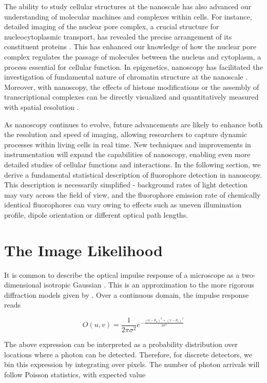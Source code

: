 The ability to study cellular structures at the nanoscale has also advanced our understanding of molecular machines and complexes within cells. For instance, detailed imaging of the nuclear pore complex, a crucial structure for nucleocytoplasmic transport, has revealed the precise arrangement of its constituent proteins \parencite{Wang2023}. This has enhanced our knowledge of how the nuclear pore complex regulates the passage of molecules between the nucleus and cytoplasm, a process essential for cellular function. In epigenetics, nanoscopy has facilitated the investigation of fundamental nature of chromatin structure at the nanoscale \parencite{Ricci2015}. Moreover, with nanoscopy, the effects of histone modifications or the assembly of transcriptional complexes can be directly visualized and quantitatively measured with spatial resolution \parencite{Ricci2015,Nozaki2017,Boettiger2016}.

As nanoscopy continues to evolve, future advancements are likely to enhance both the resolution and speed of imaging, allowing researchers to capture dynamic processes within living cells in real time. New techniques and improvements in instrumentation will expand the capabilities of nanoscopy, enabling even more detailed studies of cellular functions and interactions. In the following section, we derive a fundamental statistical description of fluorophore detection in nanoscopy. This description is necessarily simplified - background rates of light detection may vary across the field of view, and the fluorophore emission rate of chemically identical fluorophores can vary owing to effects such as uneven illumination profile, dipole orientation or different optical path lengths.


\section{The Image Likelihood}

It is common to describe the optical impulse response of a microscope as a two-dimensional isotropic Gaussian \parencite{Zhang2007}. This is an approximation to the more rigorous diffraction models given by \parencite{Richards1959,Gibson1989}. Over a continuous domain, the impulse response reads

\begin{equation*}
O(u,v) = \frac{1}{2\pi\sigma^{2}}e^{-\frac{(u-\theta_{u})^{2}+(v-\theta_{v})^{2}}{2\sigma^{2}}}
\end{equation*}

The above expression can be interpreted as a probability distribution over locations where a photon can be detected. Therefore, for discrete detectors, we bin this expression by integrating over pixels. The number of photon arrivals will follow Poisson statistics, with expected value

